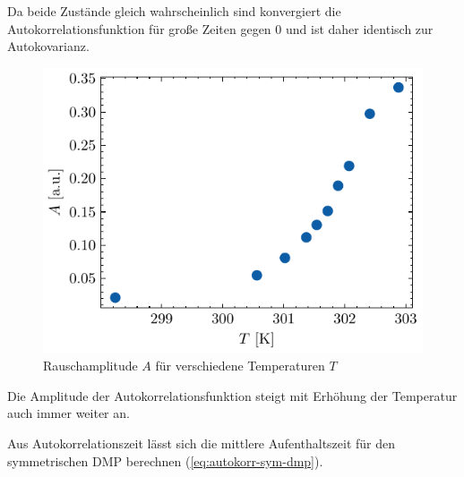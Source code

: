 \documentclass[main.tex]{subfiles}
\begin{document}
Da beide Zustände gleich wahrscheinlich sind konvergiert die Autokorrelationsfunktion für große Zeiten gegen 0 und ist daher identisch zur Autokovarianz. 


\begin{figure}[H]
    \centering
    \includegraphics{bilder/plots/temp_comparison_long/rauschamplitude.pdf}
    \caption{Rauschamplitude $A$ für verschiedene Temperaturen $T$ }\label{fig:temp-autocorr-amplitude}
\end{figure}

Die Amplitude der Autokorrelationsfunktion steigt mit Erhöhung der Temperatur auch immer weiter an.

Aus Autokorrelationszeit lässt sich die mittlere Aufenthaltszeit für den symmetrischen DMP berechnen (\cref{eq:autokorr-sym-dmp}).


\end{document}
